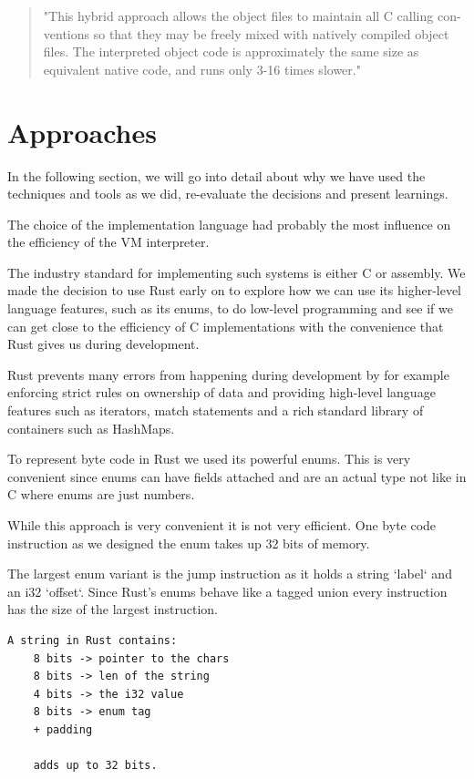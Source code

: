 \documentclass{article}
\begin{document}
\begin{quotation}
"This hybrid approach allows the object files to maintain all C calling con-
ventions so that they may be freely mixed with natively compiled object
files. The interpreted object code is approximately the same size as
equivalent native code, and runs only 3-16 times slower." ~\cite{superoperator}
\end{quotation}

\section{Approaches}
In the following section, we will go into detail about why we have used the 
techniques and tools as we did, re-evaluate the decisions and present 
learnings.

The choice of the implementation language had probably the most influence on
the efficiency of the VM interpreter.

The industry standard for implementing such systems is either C or assembly.
We made the decision to use Rust early on to explore how we can use its
higher-level language features, such as its enums, to do low-level programming
and see if we can get close to the efficiency of C implementations with the convenience that Rust gives us during development.

Rust prevents many errors from happening during development by for example
enforcing strict rules on ownership of data and providing high-level language
features such as iterators, match statements and a rich standard library of 
containers such as HashMaps.

To represent byte code in Rust we used its powerful enums. This is very
convenient since enums can have fields attached and are an actual type not like
in C where enums are just numbers.

While this approach is very convenient it is not very efficient. One byte code
instruction as we designed the enum takes up 32 bits of memory.

The largest enum variant is the jump instruction as it holds a string `label`
and an i32 `offset`. Since Rust's enums behave like a tagged union every
instruction has the size of the largest instruction.

\begin{verbatim}
A string in Rust contains:
    8 bits -> pointer to the chars
    8 bits -> len of the string
    4 bits -> the i32 value
    8 bits -> enum tag
    + padding

    adds up to 32 bits.
\end{verbatim}
\end{document}

